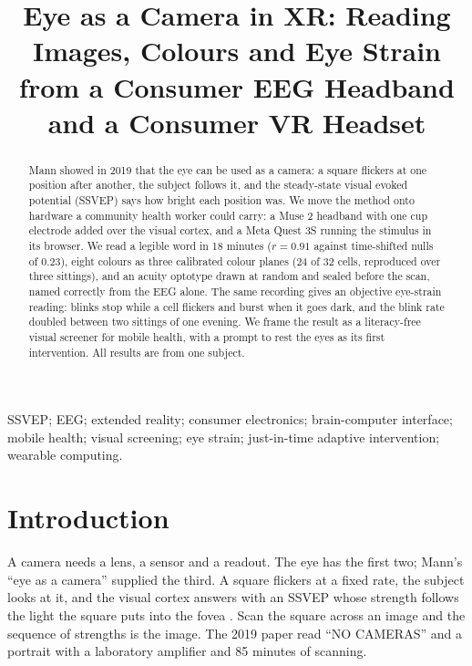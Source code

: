 \documentclass[conference]{IEEEtran}
\begin{document}
\title{Eye as a Camera in XR: Reading Images, Colours and Eye Strain from a Consumer EEG Headband and a Consumer VR Headset}

\author{
}

\maketitle

\begin{abstract}
Mann showed in 2019 that the eye can be used as a camera: a square flickers at one position after another, the subject follows it, and the steady-state visual evoked potential (SSVEP) says how bright each position was. We move the method onto hardware a community health worker could carry: a Muse 2 headband with one cup electrode added over the visual cortex, and a Meta Quest 3S running the stimulus in its browser. We read a legible word in 18 minutes ($r = 0.91$ against time-shifted nulls of 0.23), eight colours as three calibrated colour planes (24 of 32 cells, reproduced over three sittings), and an acuity optotype drawn at random and sealed before the scan, named correctly from the EEG alone. The same recording gives an objective eye-strain reading: blinks stop while a cell flickers and burst when it goes dark, and the blink rate doubled between two sittings of one evening. We frame the result as a literacy-free visual screener for mobile health, with a prompt to rest the eyes as its first intervention. All results are from one subject.
\end{abstract}

\begin{IEEEkeywords}
SSVEP; EEG; extended reality; consumer electronics; brain-computer interface; mobile health; visual screening; eye strain; just-in-time adaptive intervention; wearable computing.
\end{IEEEkeywords}

\section{Introduction}

A camera needs a lens, a sensor and a readout. The eye has the first two; Mann's ``eye as a camera'' \cite{mann2019eye, mann2019wearsys} supplied the third. A square flickers at a fixed rate, the subject looks at it, and the visual cortex answers with an SSVEP whose strength follows the light the square puts into the fovea \cite{norcia2015ssvep, vialatte2010ssvep}. Scan the square across an image and the sequence of strengths is the image. The 2019 paper read ``NO CAMERAS'' and a portrait with a laboratory amplifier and 85 minutes of scanning.
\end{document}

